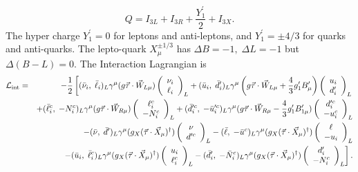 \documentclass{ws-ijmpa}
\begin{document}
\begin{equation}
Q = I_{3L}+I_{3R}+\frac{Y^{\prime}_1}{2}+I_{3X}.
\end{equation}
The hyper charge $Y^{\prime}_{1} = 0$ for leptons and anti-leptons, and  $Y^{\prime}_{1} = \pm 4/3$ for quarks and anti-quarks.
The lepto-quark $X^{\pm 1/3}_{\mu}$ has  $\Delta B= -1, \; \Delta L = -1$ but  $\Delta (B-L)=0$. The Interaction Lagrangian is
\begin{eqnarray}
\mathcal{L}_{\text{int}}&=&-\frac{1}{2}\left[(\bar{\nu}_i,\; \bar{\ell}_{i})_{L}\gamma^{\mu}(g\vec{\tau}\cdot  \vec{W}_{L\mu})\left(\begin{array}{c} \nu_i \\ {\ell_i}\end{array}\right)_L + (\bar{u}_i,\; \bar{d}^{\prime}_{i})_{L}\gamma^{\mu}\left(g\vec{\tau}\cdot \vec{W}_{L\mu}+\frac{4}{3}g^{\prime}_{1}B^{\prime}_{\mu}\right)\left(\begin{array}{c} u_i \\ d^{\prime}_i\end{array}\right)_L\right.\notag \\
&&+(\bar{\ell}^{c}_i,\; -N^{c}_{i})_{L}\gamma^{\mu}(g\vec{\tau}\cdot  \vec{W}_{R\mu})\left(\begin{array}{c} \ell^{c}_i \\ -N^{c}_i\end{array}\right)_L + (\bar{d}^{\prime c}_i,\; -\bar{u}^{\prime c}_{i})_{L}\gamma^{\mu}(g\vec{\tau}\cdot  \vec{W}_{R\mu}-\frac{4}{3}g^{\prime}_{1}B^{\prime}_{1 \mu})\left(\begin{array}{c} d^{\prime c}_i \\ -u^{c}_i\end{array}\right)_L \notag\\
&&-(\bar{\nu},\; \bar{d}^{\prime})_{L}\gamma^{\mu}(g_{X}(\vec{\tau}\cdot  \vec{X}_{\mu})^{\dag})\left(\begin{array}{c} \nu \\ d^{\prime c}\end{array}\right)_L - (\bar{\ell},\; -\bar{u}^{c})_{L}\gamma^{\mu}(g_{X}(\vec{\tau}\cdot  \vec{X}_{\mu})^{\dag})\left(\begin{array}{c} \ell \\ -u_i \end{array}\right)_L\notag \\
&&\left.-(\bar{u}_i,\; \bar{\ell}^{c}_{i})_{L}\gamma^{\mu}(g_{X}(\vec{\tau}\cdot  \vec{X}_{\mu})^{\dag})\left(\begin{array}{c} u_i \\ \ell^{c}_i\end{array}\right)_L - (\bar{d}^{\prime}_i,\; -\bar{N}^{c}_{i})_{L}\gamma^{\mu}(g_{X}(\vec{\tau}\cdot  \vec{X}_{\mu})^{\dag})\left(\begin{array}{c} d^{\prime}_i \\ -N^{c}_i\end{array}\right)_L\right]\label{Lag-Scen-2}.
\end{eqnarray}
\end{document}
